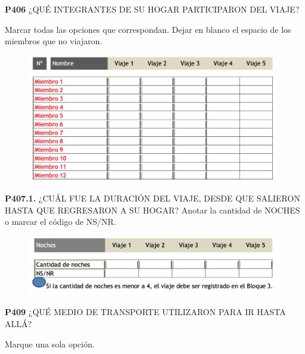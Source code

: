 \documentclass[
  openany]{book}
\begin{document}
\textbf{P406} ¿QUÉ INTEGRANTES DE SU HOGAR PARTICIPARON DEL VIAJE?

Marcar todas las opciones que correspondan. Dejar en blanco el espacio de los miembros que no viajaron.

\begin{figure}

{\centering \includegraphics[width=1\linewidth]{imagenes/figura6-179} 

}

\end{figure}

\textbf{P407.1.} ¿CUÁL FUE LA DURACIÓN DEL VIAJE, DESDE QUE SALIERON HASTA QUE REGRESARON A SU HOGAR?
Anotar la cantidad de NOCHES o marcar el código de NS/NR.

\begin{figure}

{\centering \includegraphics[width=1\linewidth]{imagenes/figura6-180} 

}

\end{figure}

\textbf{P409} ¿QUÉ MEDIO DE TRANSPORTE UTILIZARON PARA IR HASTA ALLÁ?

Marque una sola opción.
\end{document}
